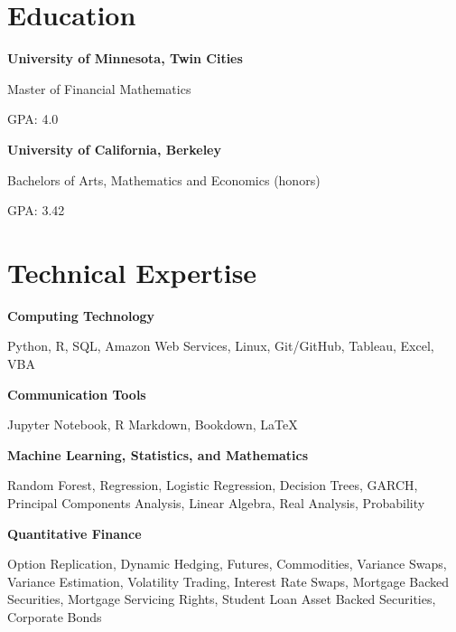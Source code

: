 \documentclass[11pt, a4paper]{awesome-cv}
\begin{document}
\normalsize

\hypertarget{education}{%
\section{Education}\label{education}}

\textbf{University of Minnesota, Twin Cities}

\vspace{-1ex}

Master of Financial Mathematics

\vspace{-1ex}

GPA: 4.0

\textbf{University of California, Berkeley}

\vspace{-1ex}

Bachelors of Arts, Mathematics and Economics (honors)

\vspace{-1ex}

GPA: 3.42

\hypertarget{technical-expertise}{%
\section{Technical Expertise}\label{technical-expertise}}

\textbf{Computing Technology}

\vspace{-1ex}

Python, R, SQL, Amazon Web Services, Linux, Git/GitHub, Tableau, Excel,
VBA

\textbf{Communication Tools}

\vspace{-1ex}

Jupyter Notebook, R Markdown, Bookdown, \LaTeX

\textbf{Machine Learning, Statistics, and Mathematics}

\vspace{-1ex}

Random Forest, Regression, Logistic Regression, Decision Trees, GARCH,
Principal Components Analysis, Linear Algebra, Real Analysis,
Probability

\textbf{Quantitative Finance}

\vspace{-1ex}

Option Replication, Dynamic Hedging, Futures, Commodities, Variance
Swaps, Variance Estimation, Volatility Trading, Interest Rate Swaps,
Mortgage Backed Securities, Mortgage Servicing Rights, Student Loan
Asset Backed Securities, Corporate Bonds
\end{document}
